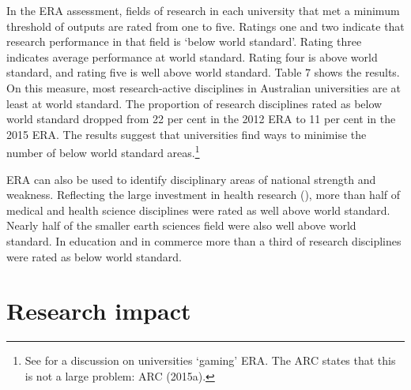 \documentclass{grattan}
\begin{document}
In the ERA assessment, fields of research in each university that met a minimum threshold of outputs are rated from one to five. Ratings one and two indicate that research performance in that field is `below world standard'. Rating three indicates average performance at world standard. Rating four is above world standard, and rating five is well above world standard. Table 7 shows the results. On this measure, most research-active disciplines in Australian universities are at least at world standard. The proportion of research disciplines rated as below world standard dropped from 22 per cent in the 2012 ERA to 11 per cent in the 2015 ERA. The results suggest that universities find ways to minimise the number of below world standard areas.\footnote{See \textcite[][]{Henman2015areaustralianuniv} for a discussion on universities `gaming' ERA. The ARC states that this is not a large problem: ARC (2015a).}

\begin{table} \caption{Excellence in Research for Australia, 2015}


\end{table}

ERA can also be used to identify disciplinary areas of national strength and weakness. Reflecting the large investment in health research (), more than half of medical and health science disciplines were rated as well above world standard. Nearly half of the smaller earth sciences field were also well above world standard. In education and in commerce more than a third of research disciplines were rated as below world standard.

%
\section{Research impact }\label{sec:research-impact}
\end{document}
